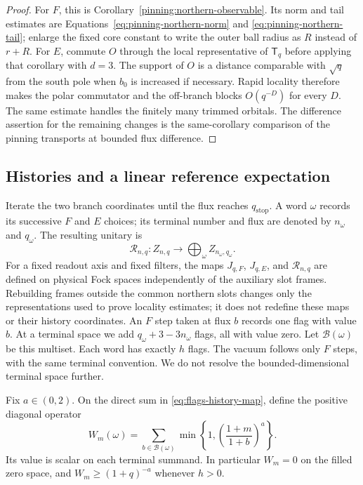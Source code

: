 \begin{proof}
For $F$, this is Corollary~\ref{pinning:northern-observable}.
Its norm and tail estimates are
Equations~\eqref{eq:pinning-northern-norm} and
\eqref{eq:pinning-northern-tail}; enlarge the fixed core constant to
write the outer ball radius as $R$ instead of $r+R$.
For $E$, commute $O$ through the local representative of $\mathsf T_q$ before
applying that corollary with $d=3$.  The support of $O$ is a distance
comparable with $\sqrt q$ from the south pole when $b_0$ is increased
if necessary.  Rapid locality therefore makes the polar commutator and
the off-branch blocks $O(q^{-D})$ for every $D$.  The same estimate
handles the finitely many trimmed orbitals.  The difference assertion
for the remaining changes is the same-corollary comparison of the
pinning transports at bounded flux difference.
\end{proof}

\subsection{Histories and a linear reference expectation}

Iterate the two branch coordinates until the flux reaches
$q_{\mathrm{stop}}$.  A word $\omega$ records its successive $F$ and
$E$ choices; its terminal number and flux are denoted by $n_\omega$
and $q_\omega$.  The resulting unitary is
\begin{equation}
 \mathcal R_{n,q}:Z_{n,q}\longrightarrow
       \bigoplus_{\omega}Z_{n_\omega,q_\omega}.
 \label{eq:flags-history-map}
\end{equation}
For a fixed readout axis and fixed filters, the maps $J_{q,F}$,
$J_{q,E}$, and $\mathcal R_{n,q}$ are defined on physical Fock spaces
independently of the auxiliary slot frames.  Rebuilding frames outside
the common northern slots changes only the representations used to
prove locality estimates; it does not redefine these maps or their
history coordinates.
An $F$ step taken at flux $b$ records one flag with value $b$.  At a
terminal space we add $q_\omega+3-3n_\omega$ flags, all with value zero.
Let $\mathcal B(\omega)$ be this multiset.  Each word has exactly $h$
flags.  The vacuum follows only $F$ steps, with the same terminal
convention.  We do not resolve the bounded-dimensional terminal space
further.

Fix $a\in(0,2)$.  On the direct sum in
\eqref{eq:flags-history-map}, define the positive diagonal operator
\begin{equation}
 W_m(\omega)=\sum_{b\in\mathcal B(\omega)}
       \min\left\{1,\left(\frac{1+m}{1+b}\right)^a\right\}.
 \label{eq:flags-history-weight}
\end{equation}
Its value is scalar on each terminal summand.  In particular $W_m=0$
on the filled zero space, and $W_m\geq(1+q)^{-a}$ whenever $h>0$.

